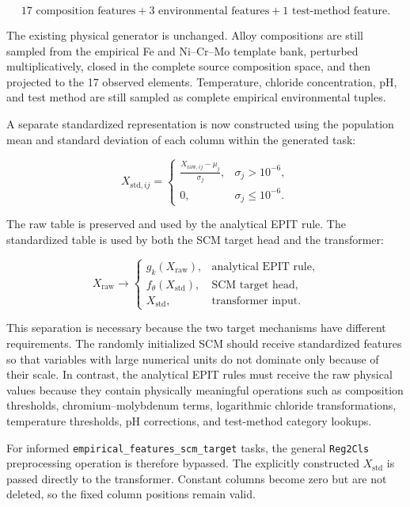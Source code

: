 \documentclass{article}
\begin{document}
\[
17\text{ composition features}
+
3\text{ environmental features}
+
1\text{ test-method feature}.
\]

The existing physical generator is unchanged. Alloy compositions are still
sampled from the empirical Fe and Ni--Cr--Mo template bank, perturbed
multiplicatively, closed in the complete source composition space, and then
projected to the 17 observed elements. Temperature, chloride concentration,
pH, and test method are still sampled as complete empirical environmental
tuples.

A separate standardized representation is now constructed using the
population mean and standard deviation of each column within the generated
task:

\[
X_{\mathrm{std},ij}
=
\begin{cases}
\displaystyle
\frac{X_{\mathrm{raw},ij}-\mu_j}{\sigma_j},
& \sigma_j>10^{-6},\\[8pt]
0,
& \sigma_j\leq10^{-6}.
\end{cases}
\]

The raw table is preserved and used by the analytical EPIT rule. The
standardized table is used by both the SCM target head and the transformer:

\[
X_{\mathrm{raw}}
\longrightarrow
\begin{cases}
g_k(X_{\mathrm{raw}}), & \text{analytical EPIT rule},\\
f_{\theta}(X_{\mathrm{std}}), & \text{SCM target head},\\
X_{\mathrm{std}}, & \text{transformer input}.
\end{cases}
\]

This separation is necessary because the two target mechanisms have different
requirements. The randomly initialized SCM should receive standardized
features so that variables with large numerical units do not dominate only
because of their scale. In contrast, the analytical EPIT rules must receive
the raw physical values because they contain physically meaningful operations
such as composition thresholds, chromium--molybdenum terms, logarithmic
chloride transformations, temperature thresholds, pH corrections, and
test-method category lookups.

For informed
\texttt{empirical\_features\_scm\_target} tasks, the general
\texttt{Reg2Cls} preprocessing operation is therefore bypassed. The explicitly
constructed \(X_{\mathrm{std}}\) is passed directly to the transformer.
Constant columns become zero but are not deleted, so the fixed column
positions remain valid.
\end{document}

